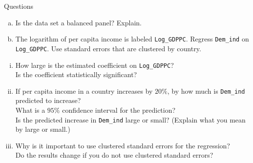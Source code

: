 \documentclass[
  10pt,
  ignorenonframetext,
]{beamer}
\providecommand{\tightlist}{%
  \setlength{\itemsep}{0pt}\setlength{\parskip}{0pt}}
\begin{document}
\begin{frame}[fragile]{Questions}
\protect\hypertarget{questions-2}{}
\begin{enumerate}
[(a)]
\tightlist
\item
  Is the data set a balanced panel? Explain.
\end{enumerate}

\vspace{3mm}

\begin{enumerate}
[(a)]
\setcounter{enumi}{1}
\tightlist
\item
  The logarithm of per capita income is labeled \texttt{Log\_GDPPC}.
  Regress \texttt{Dem\_ind} on \texttt{Log\_GDPPC}. Use standard errors
  that are clustered by country.
\end{enumerate}

\begin{enumerate}
[i.]
\item
  How large is the estimated coefficient on \texttt{Log\_GDPPC}?\\
  Is the coefficient statistically significant?
\item
  If per capita income in a country increases by \(20\%\), by how much
  is \texttt{Dem\_ind} predicted to increase?\\
  What is a \(95\%\) confidence interval for the prediction?\\
  Is the predicted increase in \texttt{Dem\_ind} large or small?
  (Explain what you mean by large or small.)
\item
  Why is it important to use clustered standard errors for the
  regression?\\
  Do the results change if you do not use clustered standard errors?
\end{enumerate}
\end{frame}
\end{document}
